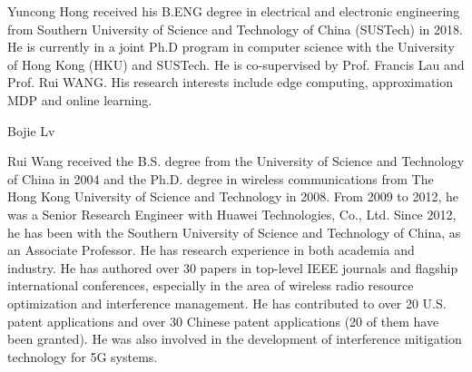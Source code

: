 
\vspace{-0.3cm}
\begin{IEEEbiography}{Yuncong Hong}
    received his B.ENG degree in electrical and electronic engineering from Southern University of Science and Technology of China (SUSTech) in 2018. He is currently in a joint Ph.D program in computer science with the University of Hong Kong (HKU) and SUSTech. He is co-supervised by Prof. Francis Lau and Prof. Rui WANG. His research interests include edge computing, approximation MDP and online learning.
\end{IEEEbiography}
\vspace{-1cm}

\begin{IEEEbiography}{Bojie Lv}
\end{IEEEbiography}
\vspace{-1cm}

\begin{IEEEbiography}{Rui Wang}
    received the B.S. degree from the University of Science and Technology of China in 2004 and the Ph.D. degree in wireless communications from The Hong Kong University of Science and Technology in 2008.
    From 2009 to 2012, he was a Senior Research Engineer with Huawei Technologies, Co., Ltd. Since 2012, he has been with the Southern University of Science and Technology of China, as an Associate Professor. He has research experience in both academia and industry. He has authored over 30 papers in top-level IEEE journals and flagship international conferences, especially in the area of wireless radio resource optimization and interference management. He has contributed to over 20 U.S. patent applications and over 30 Chinese patent applications (20 of them have been granted). He was also involved in the development of interference mitigation technology for 5G systems.
\end{IEEEbiography}
\vspace{-1cm}

